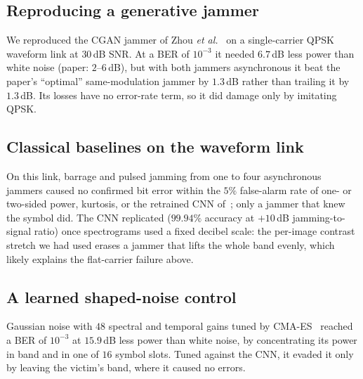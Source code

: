 \subsection{Reproducing a generative jammer}
We reproduced the CGAN jammer of Zhou \emph{et al.}~\cite{11184988} on a single-carrier QPSK waveform link at $30$\,dB SNR.
At a BER of $10^{-3}$ it needed $6.7$\,dB less power than white noise (paper: $2$--$6$\,dB), but with both jammers asynchronous it beat the paper's ``optimal'' same-modulation jammer by $1.3$\,dB rather than trailing it by $1.3$\,dB.
Its losses have no error-rate term, so it did damage only by imitating QPSK.

\subsection{Classical baselines on the waveform link}
On this link, barrage and pulsed jamming from one to four asynchronous jammers caused no confirmed bit error within the $5\%$ false-alarm rate of one- or two-sided power, kurtosis, or the retrained CNN of~\cite{li2022jamming_ofdm}; only a jammer that knew the symbol did.
The CNN replicated ($99.94\%$ accuracy at $+10$\,dB jamming-to-signal ratio) once spectrograms used a fixed decibel scale: the per-image contrast stretch we had used erases a jammer that lifts the whole band evenly, which likely explains the flat-carrier failure above.

\subsection{A learned shaped-noise control}
Gaussian noise with $48$ spectral and temporal gains tuned by CMA-ES~\cite{hansen2016cma} reached a BER of $10^{-3}$ at $15.9$\,dB less power than white noise, by concentrating its power in band and in one of $16$ symbol slots.
Tuned against the CNN, it evaded it only by leaving the victim's band, where it caused no errors.

